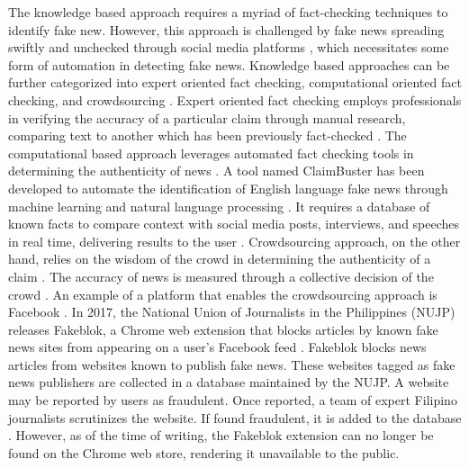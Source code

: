 The knowledge based approach requires a myriad of fact-checking techniques to identify fake new. However, this approach is challenged by fake news spreading swiftly and unchecked through social media platforms \cite{qazvinian2011rumor}, which necessitates some form of automation in detecting fake news. Knowledge based approaches can be further categorized into expert oriented fact checking, computational oriented fact checking, and crowdsourcing \cite{debeer2020approaches}. Expert oriented fact checking employs professionals in verifying the accuracy of a particular claim through manual research, comparing text to another which has been previously fact-checked \cite{vlachos2014factchecking}.  The computational based approach leverages automated fact checking tools in determining the authenticity of news \cite{ahmed2019combining}. A tool named ClaimBuster \cite{claimbuster, hassan2017proposal} has been developed to automate the identification of English language fake news through machine learning and natural language processing \cite{hassan2017toward}. It requires a database of known facts to compare context with social media posts, interviews, and speeches in real time, delivering results to the user \cite{hassan2017toward}. Crowdsourcing approach, on the other hand, relies on the wisdom of the crowd in determining the authenticity of a claim \cite{ahmed2019combining}. The accuracy of news is measured through a collective decision of the crowd \cite{pennycook2019fighting}. An example of a platform that enables the crowdsourcing approach is Facebook \cite{tschiatschek2017detecting}. In 2017, the National Union of Journalists in the Philippines (NUJP) releases Fakeblok, a Chrome web extension that blocks articles by known fake news sites from appearing on a user's Facebook feed \cite{inquirer-fakeblok, rappler-fakeblok}. Fakeblok blocks news articles from websites known to publish fake news. These websites tagged as fake news publishers are collected in a database maintained by the NUJP. A website may be reported by users as fraudulent. Once reported, a team of expert Filipino journalists scrutinizes the website. If found fraudulent, it is added to the database \cite{cdi-fakeblok}. However, as of the time of writing, the Fakeblok extension can no longer be found on the Chrome web store, rendering it unavailable to the public.

